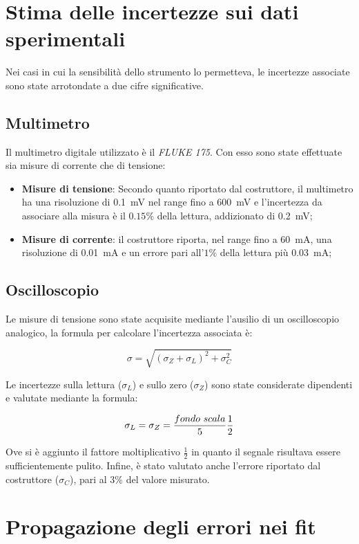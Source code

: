 \documentclass[../main.tex]{subfiles}
\begin{document}
\section{Stima delle incertezze sui dati sperimentali}
  \label{sec:propagazione-errori-misure}
  Nei casi in cui la sensibilità dello strumento lo permetteva, le incertezze associate sono
  state arrotondate a due cifre significative.
  \subsection*{Multimetro}
    Il multimetro digitale utilizzato è il \textit{FLUKE 175}.
    Con esso sono state effettuate sia misure di corrente che di tensione:
    \begin{itemize}
      \item \textbf{Misure di tensione}: Secondo quanto riportato dal costruttore, il multimetro
      ha una risoluzione di 0.1~mV nel range fino a 600~mV e l'incertezza da associare alla misura
      è il $0.15\%$ della lettura, addizionato di 0.2~mV;
      \item \textbf{Misure di corrente}: il costruttore riporta, nel range fino a
      60~mA, una risoluzione di 0.01~mA e un errore pari all'$1\%$ della
      lettura più 0.03~mA;
    \end{itemize}

  \subsection*{Oscilloscopio}
    \noindent Le misure di tensione sono state acquisite mediante l'ausilio di un oscilloscopio analogico,
    la formula per calcolare l'incertezza associata è:

    \begin{equation*}
      \sigma = \sqrt {\left( \sigma_Z + \sigma_L  \right)^2 + \sigma_C^2}
    \end{equation*}

    \vspace{0.1cm}
    \noindent Le incertezze sulla lettura ($\sigma_L$) e sullo zero ($\sigma_Z$) sono state considerate dipendenti
    e valutate mediante la formula:
    \vspace{0.1cm}


    \begin{equation*}
      \sigma_L = \sigma_Z = \frac{fondo\textnormal{ }scala}{5} \frac{1}{2}
    \end{equation*}

    \noindent Ove si è aggiunto il fattore moltiplicativo $\frac{1}{2}$ in quanto il segnale risultava
    essere sufficientemente pulito.\newline\newline
    \noindent Infine, è stato valutato anche l'errore riportato dal costruttore ($\sigma_C$), pari
    al 3\% del valore misurato.

\section{Propagazione degli errori nei fit}
  \label{sec:propagazione-errori-log}
\end{document}
